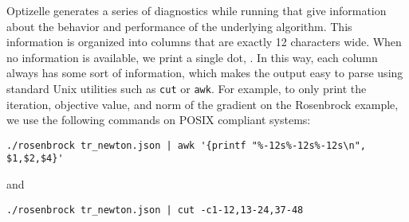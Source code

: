 \documentclass{report}
\makeatletter
\DeclareRobustCommand*{\textct}[1]{%
  \begingroup\@activeus\scantokens{\texttt{#1}\endinput}\endgroup}
\makeatother
\begin{document}
        Optizelle generates a series of diagnostics while running that give information about the behavior and performance of the underlying algorithm.  This information is organized into columns that are exactly 12 characters wide.  When no information is available, we print a single dot, \textct{.}.  In this way, each column always has some sort of information, which makes the output easy to parse using standard Unix utilities such as \texttt{cut} or \texttt{awk}.  For example, to only print the iteration, objective value, and norm of the gradient on the Rosenbrock example, we use the following commands on POSIX compliant systems:
\begin{center}\begin{verbatim}
./rosenbrock tr_newton.json | awk '{printf "%-12s%-12s%-12s\n", $1,$2,$4}'
\end{verbatim}\end{center}
\noindent and
\begin{center}\begin{verbatim}
./rosenbrock tr_newton.json | cut -c1-12,13-24,37-48
\end{verbatim}\end{center}
\end{document}
